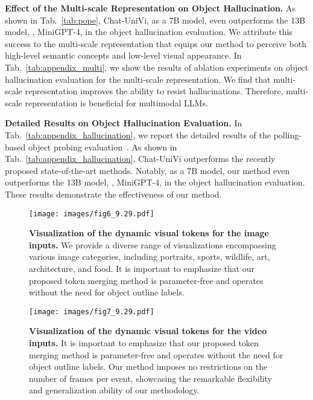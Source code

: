 \documentclass[10pt,twocolumn,letterpaper]{article}
\newcommand{\myparagraph}[1]{\textbf{#1}\hspace{1.8ex}}
\begin{document}
\noindent \myparagraph{Effect of the Multi-scale Representation on Object Hallucination.}
As shown in Tab.~\ref{tab:pope}, Chat-UniVi, as a 7B model, even outperforms the 13B model, \eg, MiniGPT-4, in the object hallucination evaluation. We attribute this success to the multi-scale representation that equips our method to perceive both high-level semantic concepts and low-level visual appearance. In Tab.~\ref{tab:appendix_multi}, we show the results of ablation experiments on object hallucination evaluation for the multi-scale representation. We find that multi-scale representation improves the ability to resist hallucinations. Therefore, multi-scale representation is beneficial for multimodal LLMs.

\noindent \myparagraph{Detailed Results on Object Hallucination Evaluation.}
In Tab.~\ref{tab:appendix_hallucination}, we report the detailed results of the polling-based object probing evaluation~\cite{li2023evaluating}. As shown in Tab.~\ref{tab:appendix_hallucination}, Chat-UniVi outperforms the recently proposed state-of-the-art methods. Notably, as a 7B model, our method even outperforms the 13B model, \eg, MiniGPT-4, in the object hallucination evaluation. These results demonstrate the effectiveness of our method.

\begin{figure*}[t]
\centering
\texttt{[image: images/fig6\_9.29.pdf]}
\caption{\textbf{Visualization of the dynamic visual tokens for the image inputs.} We provide a diverse range of visualizations encompassing various image categories, including portraits, sports, wildlife, art, architecture, and food. It is important to emphasize that our proposed token merging method is parameter-free and operates without the need for object outline labels.}
\vspace{-1.em}
\label{fig:appendix_dynamic visual tokens0}
\end{figure*}

\begin{figure*}[t]
\centering
\texttt{[image: images/fig7\_9.29.pdf]}
\caption{\textbf{Visualization of the dynamic visual tokens for the video inputs.} It is important to emphasize that our proposed token merging method is parameter-free and operates without the need for object outline labels. Our method imposes no restrictions on the number of frames per event, showcasing the remarkable flexibility and generalization ability of our methodology.}
\vspace{-1.em}
\label{fig:appendix_dynamic visual tokens1}
\end{figure*}
\end{document}

